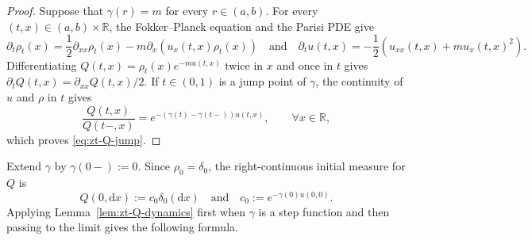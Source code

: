 \documentclass[10pt]{amsart}
\theoremstyle{definition}
\theoremstyle{remark}
\numberwithin{equation}{section}
\newcommand{\R}{\mathbb R}
\newcommand{\1}{\mathbf 1}
\begin{document}
\begin{proof}
Suppose that $\gamma(r)=m$ for every $r\in(a,b)$. For every $(t,x)\in(a,b)\times\R$, the Fokker--Planck equation and the Parisi PDE give
\begin{equation*}
 \partial_t\rho_t(x)=\frac12\partial_{xx}\rho_t(x)-m\partial_x(u_x(t,x)\rho_t(x))
 \quad\text{and}\quad
 \partial_tu(t,x)=-\frac12(u_{xx}(t,x)+mu_x(t,x)^2).
\end{equation*}
Differentiating $Q(t,x)=\rho_t(x)e^{-mu(t,x)}$ twice in $x$ and once in $t$ gives $\partial_tQ(t,x)=\partial_{xx}Q(t,x)/2$. If $t\in(0,1)$ is a jump point of $\gamma$, the continuity of $u$ and $\rho$ in $t$ gives
\begin{equation*}
 \frac{Q(t,x)}{Q(t-,x)}
 =e^{-(\gamma(t)-\gamma(t-))u(t,x)},
 \qquad \forall x\in\R,
\end{equation*}
which proves \eqref{eq:zt-Q-jump}.
\end{proof}

Extend $\gamma$ by $\gamma(0-):=0$.  Since $\rho_0=\delta_0$, the right-continuous initial measure for $Q$ is
\begin{equation*}
 Q(0,\mathrm d x):=c_0\delta_0(\mathrm d x)
 \quad\text{and}\quad c_0:=e^{-\gamma(0)u(0,0)}.
\end{equation*}
Applying Lemma~\ref{lem:zt-Q-dynamics} first when $\gamma$ is a step function and then passing to the limit gives the following formula.
\end{document}
